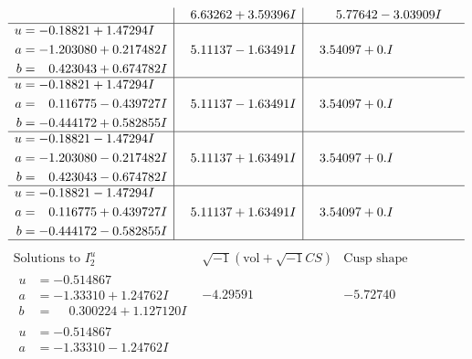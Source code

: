 \documentclass[1p]{elsarticle_modified}
\theoremstyle{definition}
\newcommand{\I}{\sqrt{-1}}
\begin{document}
$$\begin{array}{c|c|c}
 & \phantom{-}6.63262 + 3.59396 I & \phantom{-}5.77642 - 3.03909 I \\ \hline\begin{aligned}
u &= -0.18821 + 1.47294 I \\
a &= -1.203080 + 0.217482 I \\
b &= \phantom{-}0.423043 + 0.674782 I\end{aligned}
 & \phantom{-}5.11137 - 1.63491 I & \phantom{-}3.54097 + 0. I\phantom{ +0.000000I} \\ \hline\begin{aligned}
u &= -0.18821 + 1.47294 I \\
a &= \phantom{-}0.116775 - 0.439727 I \\
b &= -0.444172 + 0.582855 I\end{aligned}
 & \phantom{-}5.11137 - 1.63491 I & \phantom{-}3.54097 + 0. I\phantom{ +0.000000I} \\ \hline\begin{aligned}
u &= -0.18821 - 1.47294 I \\
a &= -1.203080 - 0.217482 I \\
b &= \phantom{-}0.423043 - 0.674782 I\end{aligned}
 & \phantom{-}5.11137 + 1.63491 I & \phantom{-}3.54097 + 0. I\phantom{ +0.000000I} \\ \hline\begin{aligned}
u &= -0.18821 - 1.47294 I \\
a &= \phantom{-}0.116775 + 0.439727 I \\
b &= -0.444172 - 0.582855 I\end{aligned}
 & \phantom{-}5.11137 + 1.63491 I & \phantom{-}3.54097 + 0. I\phantom{ +0.000000I}\\
 \hline 
 \end{array}$$\newpage$$\begin{array}{c|c|c}  
\text{Solutions to }I^u_{2}& \I (\text{vol} + \sqrt{-1}CS) & \text{Cusp shape}\\
 \hline 
\begin{aligned}
u &= -0.514867\phantom{ +0.000000I} \\
a &= -1.33310 + 1.24762 I \\
b &= \phantom{-}0.300224 + 1.127120 I\end{aligned}
 & -4.29591\phantom{ +0.000000I} & -5.72740\phantom{ +0.000000I} \\ \hline\begin{aligned}
u &= -0.514867\phantom{ +0.000000I} \\
a &= -1.33310 - 1.24762 I \\

\end{aligned}
\end{array}$$
\end{document}
